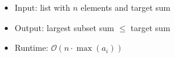 \begin{itemize}
	\item Input: list with $n$ elements and target sum
	\item Output: largest subset sum $\leq$ target sum
	\item Runtime: $\mathcal{O}(n\cdot\max(a_i))$
\end{itemize}
